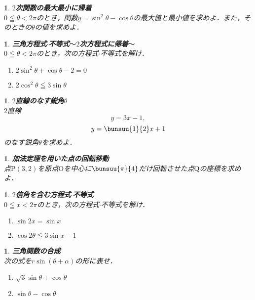 \documentclass[10pt,
fleqn,
dvipdfmx,
uplatex
]{jsarticle}
\newtheorem{question}[Question]{}
\begin{document}
\begin{question}{\bf\boldmath $2$次関数の最大最小に帰着}\\
$0\leqq \theta <2\pi$のとき，関数$y=\sin ^2\theta -\cos \theta$の最大値と最小値を求めよ．また，そのときの$\theta$の値を求めよ．
\end{question}



\begin{question}{\bf\boldmath 三角方程式$\cdot$不等式$〜2$次方程式に帰着$〜$}\\
$0\leqq \theta <2\pi$のとき，次の方程式$\cdot$不等式を解け．
\begin{enumerate}
\item $2\sin ^2\theta +\cos \theta -2=0$
\item $2\cos ^2\theta \leqq 3\sin \theta$
\end{enumerate}

\end{question}



\begin{question}{\bf\boldmath $2$直線のなす鋭角$\theta$}\\
$2$直線
\[y=3x-1, \]
\[y=\bunsuu{1}{2}x+1\]
のなす鋭角$\theta$を求めよ．
\end{question}



\begin{question}{\bf\boldmath 加法定理を用いた点の回転移動}\\
点$\text{P}\left(3,2\right)$を原点$\text{O}$を中心に$\bunsuu{\pi }{4}$だけ回転させた点$\text{Q}$の座標を求めよ．
\end{question}



\begin{question}{\bf\boldmath $2$倍角を含む方程式$\cdot$不等式}\\
$0\leqq x<2\pi$のとき，次の方程式$\cdot$不等式を解け．
\begin{enumerate}
\item $\sin 2x=\sin x$
\item $\cos 2\theta \leqq 3\sin x-1$
\end{enumerate}

\end{question}



\begin{question}{\bf\boldmath 三角関数の合成}\\
次の式を$r\sin \left(\theta +\alpha \right)$の形に表せ．
\begin{enumerate}
\item $\sqrt 3\sin \theta +\cos \theta$
\item $\sin \theta -\cos \theta$
\end{enumerate}

\end{question}
\end{document}
